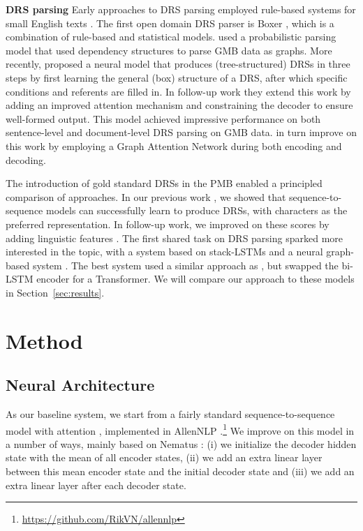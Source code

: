 \documentclass[11pt,a4paper]{article}
\newcommand{\inlineheader}[1]{\vspace{0.06cm}
\noindent\textbf{#1}\quad
}
\begin{document}
\inlineheader{DRS parsing} Early approaches to DRS parsing employed rule-based systems for small English texts \citep{johnsonklein, wadaasher, Bos2001ICOS}. The first open domain DRS parser is Boxer \citep{step2008:boxer, boxer}, which is a combination of rule-based and statistical models. 
\citet{le:12} used a probabilistic parsing model that used dependency structures to parse GMB data as graphs. More recently, \citet{neural_drs_gmb:18} proposed a neural model that produces (tree-structured) DRSs in three steps by first learning the general (box) structure of a DRS, after which specific conditions and referents are filled in. In follow-up work \citep{liu-etal-2019-acl} they extend this work by adding an improved attention mechanism and constraining the decoder to ensure well-formed output. This model achieved impressive performance on both sentence-level and document-level DRS parsing on GMB data. \citet{fu2020drts} in turn improve on this work by employing a Graph Attention Network during both encoding and decoding. 


The introduction of gold standard DRSs in the PMB enabled a principled comparison of approaches. 
In our previous work \citep{drstacl:18}, we showed that sequence-to-sequence models can successfully learn to produce DRSs, with characters as the preferred representation. In follow-up work, we improved on these scores by adding linguistic features \citep{van-noord-etal-2019-linguistic}. The first shared task on DRS parsing \citep{abzianidze-etal-2019-first} sparked more interested in the topic, with a system based on stack-LSTMs \citep{evang-2019-transition} and a neural graph-based system \citep{fancellu-etal-2019-semantic}. The best system \citep{liu-etal-2019-discourse} used a similar approach as \citet{drstacl:18}, but swapped the bi-LSTM encoder for a Transformer. We will compare our approach to these models in Section~\ref{sec:results}.

\vspace{-0.1cm}
\section{Method}
\vspace{-0.1cm}

\subsection{Neural Architecture}
\label{sec:neural}

As our baseline system, we start from a fairly standard sequence-to-sequence model with attention \citep{bahdanau2015neural}, implemented in AllenNLP \cite{Gardner2017AllenNLP}.\footnote{\url{https://github.com/RikVN/allennlp}} We improve on this model in a number of ways, mainly based on Nematus \citep{sennrich-etal-2017-nematus}: (i) we initialize the decoder hidden state with the mean of all encoder states, (ii) we add an extra linear layer between this mean encoder state and the initial decoder state and (iii) we add an extra linear layer after each decoder state.
\end{document}
